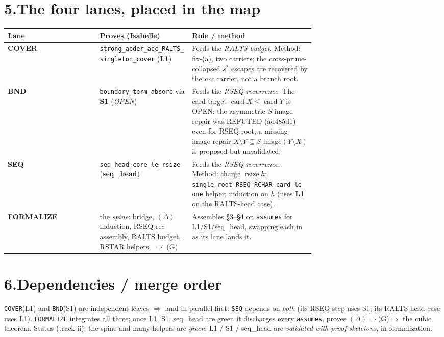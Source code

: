 \documentclass[11pt]{article}
\newcommand{\rsz}{\operatorname{rsize}}
\newcommand{\card}{\operatorname{card}}
\newcommand{\Sstrong}{S}
\newcommand{\code}[1]{\texttt{\small #1}}
\begin{document}
\section*{5.\quad The four lanes, placed in the map}
\renewcommand{\arraystretch}{1.35}
\begin{center}\small
\begin{tabular}{@{}>{\bfseries}l p{0.30\linewidth} p{0.40\linewidth}@{}}
\toprule
Lane & Proves (Isabelle) & Role / method \\
\midrule
COVER & \code{strong\_apder\_acc\_RALTS\_singleton\_cover} (\textbf{L1}) &
Feeds the \emph{RALTS budget}. Method: fix-(a), two carriers; the cross-prune-collapsed $s^{*}$ escapes are
recovered by the \emph{acc} carrier, not a branch root. \\
BND & \code{boundary\_term\_absorb} via \textbf{S1} (\emph{OPEN}) &
Feeds the \emph{RSEQ recurrence}. The card target $\card X\le\card Y$ is OPEN: the asymmetric
$\Sstrong$-image repair was REFUTED (ad485d1) even for RSEQ-root; a missing-image repair
$X\setminus Y\subseteq\Sstrong\text{-image}(Y\setminus X)$ is proposed but unvalidated. \\
SEQ & \code{seq\_head\_core\_le\_rsize} (\textbf{seq\_head}) &
Feeds the \emph{RSEQ recurrence}. Method: charge $\rsz h$; \code{single\_root\_RSEQ\_RCHAR\_card\_le\_one}
helper; induction on $h$ (uses \textbf{L1} on the RALTS-head case). \\
FORMALIZE & the \emph{spine}: bridge, $(\Delta)$ induction, RSEQ-rec assembly, RALTS budget, RSTAR helpers, $\Rightarrow$ (G) &
Assembles \S3--\S4 on \code{assumes} for L1/S1/seq\_head, swapping each in as its lane lands it. \\
\bottomrule
\end{tabular}
\end{center}

\section*{6.\quad Dependencies / merge order}
\code{COVER}(L1) and \code{BND}(S1) are independent leaves $\Rightarrow$ land in parallel first.
\code{SEQ} depends on \emph{both} (its RSEQ step uses S1; its RALTS-head case uses L1).
\code{FORMALIZE} integrates all three; once L1, S1, seq\_head are green it discharges every \code{assumes},
proves $(\Delta)\Rightarrow$(G)$\Rightarrow$ the cubic theorem. Status (track ii): the spine and many helpers are
\emph{green}; L1 / S1 / seq\_head are \emph{validated with proof skeletons}, in formalization.
\end{document}
